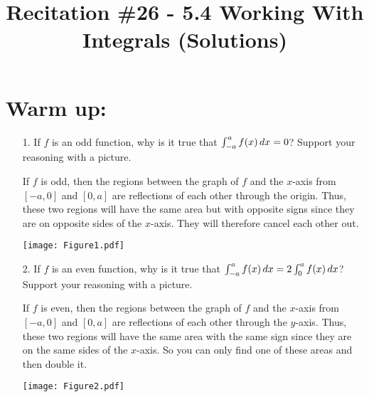\documentclass[nooutcomes]{ximera}
\title{Recitation \#26 - 5.4 Working With Integrals (Solutions)}
\begin{document}
\begin{abstract}		\end{abstract}
\maketitle

\section*{Warm up:} 
	\begin{enumerate}
		
	\item[1.]  If $f$ is an odd function, why is it true that $\int_{-a}^a f(x) \,d x = 0$?  
	Support your reasoning with a picture.
		\begin{freeResponse}
		If $f$ is odd, then the regions between the graph of $f$ and the $x$-axis from $[-a,0]$ and $[0,a]$ are reflections of each other through the origin.  Thus, these two regions will have the same area but with opposite signs since they are on opposite sides of the $x$-axis.  They will therefore cancel each other out.
		
			\begin{image}
			\texttt{[image: Figure1.pdf]}
			\end{image}

		\end{freeResponse}	
		
		
		
	\item[2.]  If $f$ is an even function, why is it true that $\int_{-a}^a f(x) \,d x = 2 \int_0^a f(x) \,d x$?  
	Support your reasoning with a picture.
		\begin{freeResponse}
		If $f$ is even, then the regions between the graph of $f$ and the $x$-axis from $[-a,0]$ and $[0,a]$ are reflections of each other through the $y$-axis.  
		Thus, these two regions will have the same area with the same sign since they are on the same sides of the $x$-axis.
		So you can only find one of these areas and then double it.
		
			\begin{image}
			\texttt{[image: Figure2.pdf]}
			\end{image}
			
		\end{freeResponse}	
		
		
		
	\end{enumerate}
		
\end{document}

